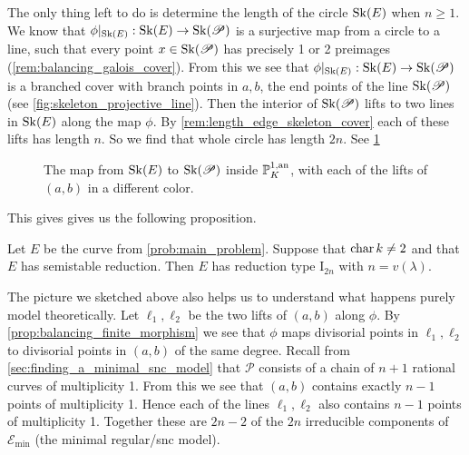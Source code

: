 The only thing left to do is determine the length of the circle $\operatorname{Sk}(E)$ when $n \ge 1$.
We know that $\phi|_{\sk(E)}:\sk (E) \to \sk(\mathscr P)$ is a surjective map from a circle to a line, such that every point $x \in \operatorname{Sk}(\mathscr P)$ has precisely 1 or 2 preimages (\cref{rem:balancing_galois_cover}). 
From this we see that $\phi|_{\sk(E)}: \sk(E) \to \sk(\mathscr P)$ is a branched cover with branch points in $a, b$, the end points of the line $\operatorname{Sk}(\mathscr P)$ (see \cref{fig:skeleton_projective_line}).
Then the interior of $\operatorname{Sk}(\mathscr P)$ lifts to two lines in $\mathscr  {\operatorname{Sk}}(E)$ along the map $\phi$.
By \cref{rem:length_edge_skeleton_cover} each of these lifts has length $n$. 
So we find that whole circle has length $2n$. 
See \cref{fig:map_circle_line}
\begin{figure}[ht]
    \centering
    \caption{The map from $\operatorname{Sk}(E)$ to $\operatorname{Sk}(\mathscr P)$ inside $\mathbb{P}^{1, \text{an}}_K$, with each of the lifts of $(a, b)$ in a different color.}
    \label{fig:map_circle_line}
\end{figure}
This gives gives us the following proposition.
\begin{proposition}
	Let $E$ be the curve from \cref{prob:main_problem}. 
	Suppose that $\operatorname{char} k \ne 2$ and that $E$ has semistable reduction. 
	Then $E$ has reduction type $\mathrm I_{2n}$ with $n = v(\lambda)$. 
\end{proposition}

The picture we sketched above also helps us to understand what happens purely model theoretically. 
Let $\ell_1, \ell_2$ be the two lifts of $(a, b)$ along $\phi$. 
By \cref{prop:balancing_finite_morphism} we see that $\phi$ maps divisorial points in $\ell_1, \ell_2$ to divisorial points in $(a, b)$ of the same degree. 
Recall from \cref{sec:finding_a_minimal_snc_model} that $\mathscr P$ consists of a chain of $n+1$ rational curves of multiplicity 1. 
From this we see that $(a, b)$ contains exactly $n -1$ points of multiplicity 1. 
Hence each of the lines $\ell_1, \ell_2$ also contains $n-1$ points of multiplicity 1.
Together these are $2n - 2$ of the  $2n$ irreducible components of $\mathscr E_\text{min} $ (the minimal regular/snc model). 

